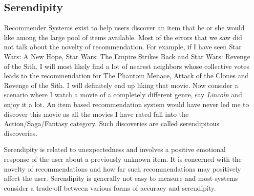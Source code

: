   \subsection{Serendipity}
  Recommender Systems exist to help users discover an item that he or she would like among the large pool of items available. Most of the errors that we saw did not talk about the novelty of recommendation. For example, if I have seen Star Wars: A New Hope, Star Wars: The Empire Strikes Back and Star Wars: Revenge of the Sith, I will most likely find a lot of nearest neighbors whose collective votes leads to the recommendation for The Phantom Menace, Attack of the Clones and Revenge of the Sith. I will definitely end up liking that movie. Now consider a scenario where I watch a movie of a completely different genre, say \textit{Lincoln} and enjoy it a lot. An item based recommendation system would have never led me to discover this movie as all the movies I have rated fall into the Action/Saga/Fantasy category. Such discoveries are called serendipitous discoveries. 

Serendipity is related to unexpectedness and involves a positive emotional response of the user about a previously unknown item. It is concerned with the novelty of recommendations and how far such recommendations may positively affect the user. Serendipity is generally not easy to measure and most systems consider a trade-off between various forms of accuracy and serendipity. 
% 
